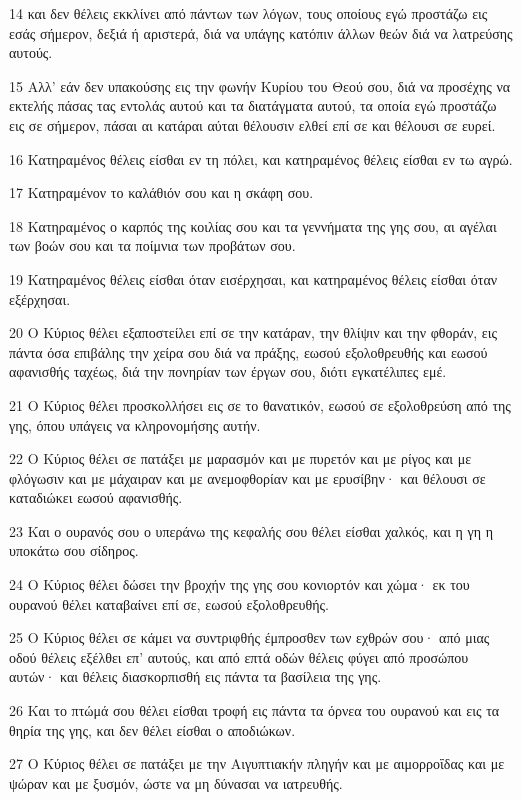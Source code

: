\par 14 και δεν θέλεις εκκλίνει από πάντων των λόγων, τους οποίους εγώ προστάζω εις εσάς σήμερον, δεξιά ή αριστερά, διά να υπάγης κατόπιν άλλων θεών διά να λατρεύσης αυτούς.
\par 15 Αλλ' εάν δεν υπακούσης εις την φωνήν Κυρίου του Θεού σου, διά να προσέχης να εκτελής πάσας τας εντολάς αυτού και τα διατάγματα αυτού, τα οποία εγώ προστάζω εις σε σήμερον, πάσαι αι κατάραι αύται θέλουσιν ελθεί επί σε και θέλουσι σε ευρεί.
\par 16 Κατηραμένος θέλεις είσθαι εν τη πόλει, και κατηραμένος θέλεις είσθαι εν τω αγρώ.
\par 17 Κατηραμένον το καλάθιόν σου και η σκάφη σου.
\par 18 Κατηραμένος ο καρπός της κοιλίας σου και τα γεννήματα της γης σου, αι αγέλαι των βοών σου και τα ποίμνια των προβάτων σου.
\par 19 Κατηραμένος θέλεις είσθαι όταν εισέρχησαι, και κατηραμένος θέλεις είσθαι όταν εξέρχησαι.
\par 20 Ο Κύριος θέλει εξαποστείλει επί σε την κατάραν, την θλίψιν και την φθοράν, εις πάντα όσα επιβάλης την χείρα σου διά να πράξης, εωσού εξολοθρευθής και εωσού αφανισθής ταχέως, διά την πονηρίαν των έργων σου, διότι εγκατέλιπες εμέ.
\par 21 Ο Κύριος θέλει προσκολλήσει εις σε το θανατικόν, εωσού σε εξολοθρεύση από της γης, όπου υπάγεις να κληρονομήσης αυτήν.
\par 22 Ο Κύριος θέλει σε πατάξει με μαρασμόν και με πυρετόν και με ρίγος και με φλόγωσιν και με μάχαιραν και με ανεμοφθορίαν και με ερυσίβην· και θέλουσι σε καταδιώκει εωσού αφανισθής.
\par 23 Και ο ουρανός σου ο υπεράνω της κεφαλής σου θέλει είσθαι χαλκός, και η γη η υποκάτω σου σίδηρος.
\par 24 Ο Κύριος θέλει δώσει την βροχήν της γης σου κονιορτόν και χώμα· εκ του ουρανού θέλει καταβαίνει επί σε, εωσού εξολοθρευθής.
\par 25 Ο Κύριος θέλει σε κάμει να συντριφθής έμπροσθεν των εχθρών σου· από μιας οδού θέλεις εξέλθει επ' αυτούς, και από επτά οδών θέλεις φύγει από προσώπου αυτών· και θέλεις διασκορπισθή εις πάντα τα βασίλεια της γης.
\par 26 Και το πτώμά σου θέλει είσθαι τροφή εις πάντα τα όρνεα του ουρανού και εις τα θηρία της γης, και δεν θέλει είσθαι ο αποδιώκων.
\par 27 Ο Κύριος θέλει σε πατάξει με την Αιγυπτιακήν πληγήν και με αιμορροΐδας και με ψώραν και με ξυσμόν, ώστε να μη δύνασαι να ιατρευθής.
